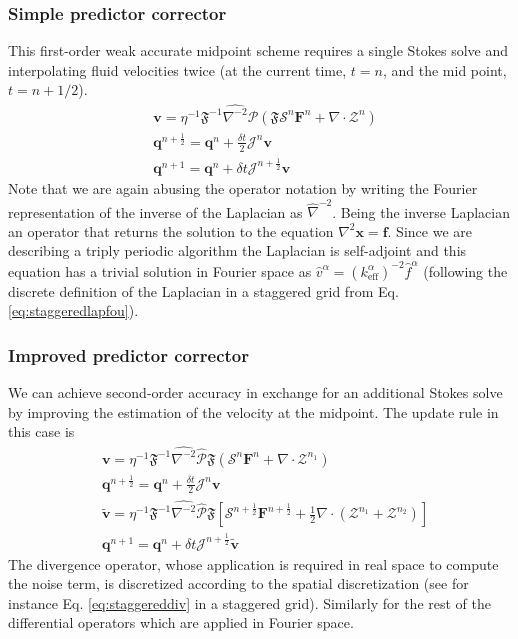 \documentclass[twoside,openright,titlepage,numbers=noenddot,%
headinclude,footinclude,cleardoublepage=empty,abstract=on,
BCOR=5mm,fontsize=11pt, dvipsnames, paper=b5
]{scrreprt}
\renewcommand{\vec}[1]{\bm{#1}}
\newcommand{\oper}[1]{\mathcal{#1}}
\newcommand{\dt}{\delta t}
\newcommand{\half}{\frac{1}{2}}
\newcommand{\fou}[1]{\widehat{#1}}
\newcommand{\ppos}{q}
\newcommand{\fvel}{v}
\begin{document}
\subsubsection*{Simple predictor corrector}
This first-order weak accurate midpoint scheme requires a single Stokes solve and interpolating fluid velocities twice (at the current time, $t=n$, and the mid point, $t=n+1/2$).
\begin{equation}
  \begin{aligned}
    &\vec{\fvel} = \eta^{-1}\mathfrak{F}^{-1}\fou{\nabla^{-2}}\fou{\oper{P}}(\mathfrak{F}\oper{S}^{n}\vec{F}^{n} + \nabla\cdot\mathcal{Z}^{n})\\
    &\vec{\ppos}^{n+\half} = \vec{\ppos}^n + \frac{\dt}{2}\oper{J}^n\vec{\fvel}\\
    &\vec{\ppos}^{n+1} = \vec{\ppos}^n + \dt\oper{J}^{n+\half}\vec{\fvel}
  \end{aligned}
\end{equation}
Note that we are again abusing the operator notation by writing the Fourier representation of the inverse of the Laplacian as $\fou\nabla^{-2}$. Being the inverse Laplacian an operator that returns the solution to the equation $\nabla^2\vec{x} = \vec{f}$. Since we are describing a triply periodic algorithm the Laplacian is self-adjoint and this equation has a trivial solution in Fourier space as $\fou{v}^\alpha = \left(k_{\text{eff}}^\alpha\right)^{-2}\fou{f}^\alpha$ (following the discrete definition of the Laplacian in a staggered grid from Eq. \eqref{eq:staggeredlapfou}).
\subsubsection*{Improved predictor corrector}
We can achieve second-order accuracy in exchange for an additional Stokes solve by improving the estimation of the velocity at the midpoint. The update rule in this case is 
\begin{equation}
  \begin{aligned}
    &\vec{\fvel} = \eta^{-1}\mathfrak{F}^{-1}\fou{\nabla^{-2}}\fou{\oper{P}}\mathfrak{F}(\oper{S}^{n}\vec{F}^{n} + \nabla\cdot\mathcal{Z}^{n_1})\\
    &\vec{\ppos}^{n+\half} = \vec{\ppos}^n + \frac{\dt}{2}\oper{J}^n\vec{\fvel}\\
    &\tilde{\vec{\fvel}}= \eta^{-1}\mathfrak{F}^{-1}\fou{\nabla^{-2}}\fou{\oper{P}}\mathfrak{F}\left[\oper{S}^{n+\half}\vec{F}^{n+\half} + \half\nabla\cdot\left(\mathcal{Z}^{n_1} +  \mathcal{Z}^{n_2}\right)\right]\\
    &\vec{\ppos}^{n+1}= \vec{\ppos}^n + \dt\oper{J}^{n+\half}\tilde{\vec{\fvel}}
  \end{aligned}      
\end{equation}
The divergence operator, whose application is required in real space to compute the noise term, is discretized according to the spatial discretization (see for instance Eq. \eqref{eq:staggereddiv} in a staggered grid). Similarly for the rest of the differential operators which are applied in Fourier space.
\end{document}
